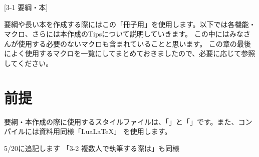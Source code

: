 \newpage
\pagestyle{leaflet}
[3-1 要綱・本]
\begin{multicols*}{2}

要綱や長い本を作成する際にはこの「冊子用{\BunTeX}」を使用します。以下では各機能・マクロ、さらには本作成のTipsについて説明していきます。
この中にはみなさんが使用する必要のないマクロも含まれていることと思います。
この章の最後によく使用するマクロを一覧にしてまとめておきましたので、必要に応じて参照してください。

\section{前提}
要綱・本作成の際に使用するスタイルファイルは、「{\BunTeXC}」と「{\BunTeXB}」です。また、コンパイルには資料用同様「Lua{\LaTeX}」
を使用します。\footnotemark[1]\\

\begin{center}
    {\selectsize{13pt}{13pt}5/20に追記します}
    {\selectsize{11pt}{11pt}「3-2 複数人で執筆する際は」も同様}
\end{center}


\begin{comment}

\section{ディレクトリ構成}
要綱・本は内容が非常に多いため、必要に応じてファイルを分割する必要があります（というかわけないと文章が煩雑になってきます）。
2022年度はchapterごとにフォルダをわけ、そこにそれぞれのchapterのTeXファイルと画像等格納フォルダを作成していく形を取りました。
以下にディレクトリ構成の例を挙げます。
\begin{border}
    \begin{forest}
        for tree={grow'=0,folder,draw}
        [作業要綱
         [main.tex：編集の必要なし]
         [はじめに
          [chapter0.tex]
          [assets
           [\dots]
          ]
         ]
         [第1章
          [chapter1.tex]
          [assets
           [kaage.jpg]
           [define.jpg]
           [neko.png]
           [\dots]
          ]
         ]
         [第2章
          [chapter2.tex]
          [assets
           [pdf1.pdf]
           [sample2.png]
           [\dots]
          ]
         ]
         [第3章
          [chapter3.tex]
          [assets
           [\dots]
          ]
         ]
         [\dots]
         [索引
          [index.tex]
         ]
         [付録
          [appendix.tex]
         ]
        ]
       \end{forest}
\end{border}


\end{comment}
\end{multicols*}
